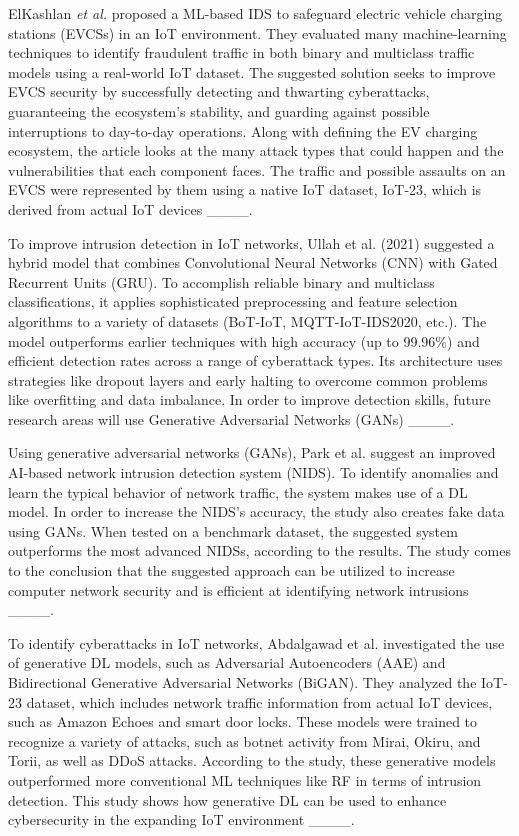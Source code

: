 ElKashlan \textit{et al.} proposed a ML-based IDS to safeguard electric vehicle charging stations (EVCSs) in an IoT environment. They evaluated many machine-learning techniques to identify fraudulent traffic in both binary and multiclass traffic models using a real-world IoT dataset.  The suggested solution seeks to improve EVCS security by successfully detecting and thwarting cyberattacks, guaranteeing the ecosystem's stability, and guarding against possible interruptions to day-to-day operations.  Along with defining the EV charging ecosystem, the article looks at the many attack types that could happen and the vulnerabilities that each component faces. The traffic and possible assaults on an EVCS were represented by them using a native IoT dataset, IoT-23, which is derived from actual IoT devices ____.

To improve intrusion detection in IoT networks, Ullah et al. (2021) suggested a hybrid model that combines Convolutional Neural Networks (CNN) with Gated Recurrent Units (GRU). To accomplish reliable binary and multiclass classifications, it applies sophisticated preprocessing and feature selection algorithms to a variety of datasets (BoT-IoT, MQTT-IoT-IDS2020, etc.). The model outperforms earlier techniques with high accuracy (up to 99.96\%) and efficient detection rates across a range of cyberattack types. Its architecture uses strategies like dropout layers and early halting to overcome common problems like overfitting and data imbalance. In order to improve detection skills, future research areas will use Generative Adversarial Networks (GANs) ____. 

Using generative adversarial networks (GANs), Park et al. suggest an improved AI-based network intrusion detection system (NIDS). To identify anomalies and learn the typical behavior of network traffic, the system makes use of a DL model.  In order to increase the NIDS's accuracy, the study also creates fake data using GANs.  When tested on a benchmark dataset, the suggested system outperforms the most advanced NIDSs, according to the results.  The study comes to the conclusion that the suggested approach can be utilized to increase computer network security and is efficient at identifying network intrusions ____.

To identify cyberattacks in IoT networks, Abdalgawad et al. investigated the use of generative DL models, such as Adversarial Autoencoders (AAE) and Bidirectional Generative Adversarial Networks (BiGAN). They analyzed the IoT-23 dataset, which includes network traffic information from actual IoT devices, such as Amazon Echoes and smart door locks. These models were trained to recognize a variety of attacks, such as botnet activity from Mirai, Okiru, and Torii, as well as DDoS attacks. According to the study, these generative models outperformed more conventional ML techniques like RF in terms of intrusion detection. This study shows how generative DL can be used to enhance cybersecurity in the expanding IoT environment ____.


%